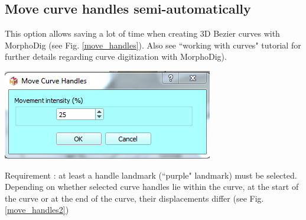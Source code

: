 \subsection{Move curve handles semi-automatically}
\noindent
\begin{minipage}{0.5\textwidth}
This option allows saving a lot of time when creating
3D Bezier curves with MorphoDig (see Fig. \ref{move_handles}). Also see ``working
with curves" tutorial for further details regarding curve digitization with MorphoDig).
\end{minipage}    
\begin{minipage}{0.5\textwidth}\centering
  \includegraphics[scale=0.5]{images/10/move.png}
 \end{minipage} 
\noindent



Requirement : at least a handle landmark (``purple" landmark) must be selected.
Depending on whether selected curve handles lie within the curve, at the start of the curve or at the
end of the curve, their displacements differ (see Fig. \ref{move_handles2})




